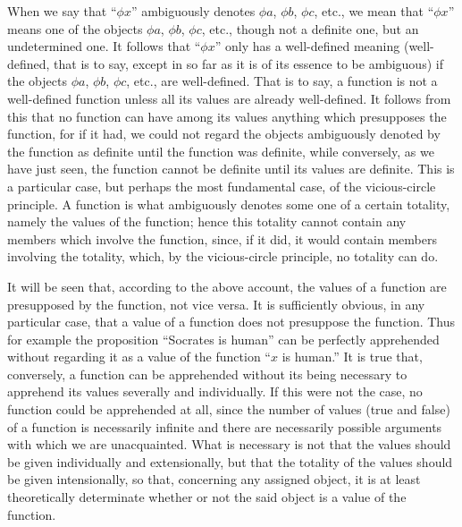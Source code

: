 \documentclass[letterpaper,12pt,openany,leqno]{book}
\newcommand{\pagefirst}[1]{\marginnote[\boxed{\text{#1}}]{\boxed{\text{#1}}}}
\begin{document}
When we say that ``$\phi x$'' ambiguously denotes $\phi a$, $\phi b$, $\phi c$, etc., we mean that ``$\phi x$'' means one of the objects $\phi a$, $\phi b$, $\phi c$, etc., though not a definite one, but an undetermined one. It follows that ``$\phi x$''  only has a well-defined meaning (well-defined, that is to say, except in so far as it is of its essence to be ambiguous) if the objects $\phi a$, $\phi b$, $\phi c$, etc., are well-defined. That is to say, a function is not a well-defined function unless all its values are already well-defined. It follows from this that no function can have among its values anything which presupposes the function, for if it had, we could not regard the objects ambiguously denoted by the function as definite until the function was definite, while conversely, as we have just seen, the function cannot be \pagefirst{42} definite until its values are definite. This is a particular case, but perhaps the most fundamental case, of the vicious-circle principle. A function is what ambiguously denotes some one of a certain totality, namely the values of the function; hence this totality cannot contain any members which involve the function, since, if it did, it would contain members involving the totality, which, by the vicious-circle principle, no totality can do.

It will be seen that, according to the above account, the values of a function are presupposed by the function, not vice versa. It is sufficiently obvious, in any particular case, that a value of a function does not presuppose the function. Thus for example the proposition ``Socrates is human'' can be perfectly apprehended without regarding it as a value of the function ``$x$ is human.'' It is true that, conversely, a function can be apprehended without its being necessary to apprehend its values severally and individually. If this were not the case, no function could be apprehended at all, since the number of values (true and false) of a function is necessarily infinite and there are necessarily possible arguments with which we are unacquainted. What is necessary is not that the values should be given individually and extensionally, but that the totality of the values should be given intensionally, so that, concerning any assigned object, it is at least theoretically determinate whether or not the said object is a value of the function. 
\end{document}
